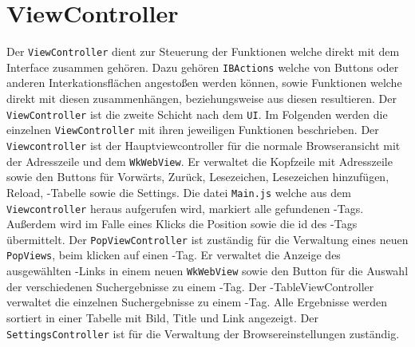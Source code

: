 
\section{ViewController}
Der \lstinline|ViewController| dient zur Steuerung der Funktionen welche direkt mit dem Interface zusammen gehören. Dazu gehören
\lstinline|IBActions| welche von Buttons oder anderen Interkationsflächen angestoßen werden können, sowie Funktionen welche direkt mit diesen zusammenhängen, beziehungsweise aus diesen resultieren. Der \lstinline|ViewController| ist die zweite Schicht nach dem \lstinline|UI|. Im
Folgenden werden die einzelnen \lstinline|ViewController| mit ihren jeweiligen Funktionen beschrieben.
Der \lstinline|Viewcontroller| ist der Hauptviewcontroller für die normale Browseransicht mit der Adresszeile und dem \lstinline|WkWebView|. Er verwaltet die Kopfzeile mit Adresszeile sowie den Buttons für Vorwärts, Zurück, Lesezeichen, Lesezeichen hinzufügen, Reload, \SECH-Tabelle sowie die Settings. Die datei \lstinline|Main.js| welche aus dem \lstinline|Viewcontroller| heraus aufgerufen wird, markiert alle gefundenen \SEARCH-Tags. Außerdem wird im Falle eines Klicks die Position sowie die id des \SEARCH-Tags übermittelt.
Der \lstinline|PopViewController| ist zuständig für die Verwaltung eines neuen \lstinline|PopViews|, beim klicken auf einen \SEARCH-Tag. Er verwaltet die Anzeige des ausgewählten \SEARCH-Links in einem neuen \lstinline|WkWebView| sowie den Button für die Auswahl der verschiedenen Suchergebnisse zu einem \SEARCH-Tag.
Der \SEARCH-TableViewController verwaltet die einzelnen Suchergebnisse zu einem \SEARCH-Tag. Alle Ergebnisse werden sortiert in einer Tabelle mit Bild, Title und Link angezeigt.
Der \lstinline|SettingsController| ist für die Verwaltung der Browsereinstellungen zuständig.


